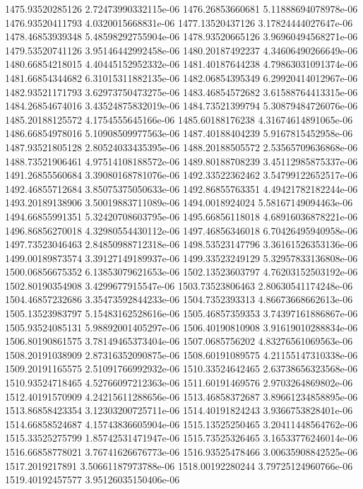 {1475.93520285126 2.72473990332115e-06
1476.26853660681 5.11888694078978e-06
1476.93520411793 4.0320015668831e-06
1477.13520437126 3.17824444027647e-06
1478.46853939348 5.48598292755904e-06
1478.93520665126 3.96960494568271e-06
1479.53520741126 3.95146442992458e-06
1480.20187492237 4.34606490266649e-06
1480.66854218015 4.40445152952332e-06
1481.40187644238 4.79863031091374e-06
1481.66854344682 6.31015311882135e-06
1482.06854395349 6.29920414012967e-06
1482.93521171793 3.62973750473275e-06
1483.46854572682 3.61588764413315e-06
1484.26854674016 3.43524875832019e-06
1484.73521399794 5.30879484726076e-06
1485.20188125572 4.1754555645166e-06
1485.60188176238 4.31674614891065e-06
1486.66854978016 5.10908509977563e-06
1487.40188404239 5.9167815452958e-06
1487.93521805128 2.80524033435395e-06
1488.20188505572 2.53565709636868e-06
1488.73521906461 4.97514108188572e-06
1489.80188708239 3.45112985875337e-06
1491.26855560684 3.39080168781076e-06
1492.33522362462 3.54799122652517e-06
1492.46855712684 3.85075375050633e-06
1492.86855763351 4.49421782182244e-06
1493.20189138906 3.50019883711089e-06
1494.0018924024 5.58167149094463e-06
1494.66855991351 5.32420708603795e-06
1495.66856118018 4.68916036878221e-06
1496.86856270018 4.32980554430112e-06
1497.46856346018 6.70426495940958e-06
1497.73523046463 2.84850988712318e-06
1498.53523147796 3.36161526353136e-06
1499.00189873574 3.39127149189937e-06
1499.33523249129 5.32957833136808e-06
1500.06856675352 6.13853079621653e-06
1502.13523603797 4.76203152503192e-06
1502.80190354908 3.4299677915547e-06
1503.73523806463 2.80630541174248e-06
1504.46857232686 3.35473592844233e-06
1504.7352393313 4.86673668662613e-06
1505.13523983797 5.15483162528616e-06
1505.46857359353 3.74397161886867e-06
1505.93524085131 5.98892001405297e-06
1506.40190810908 3.91619010288834e-06
1506.80190861575 3.78149465373404e-06
1507.0685756202 4.83276561069563e-06
1508.20191038909 2.87316352090875e-06
1508.60191089575 4.21155147310338e-06
1509.20191165575 2.51091766992932e-06
1510.33524642465 2.63738656323568e-06
1510.93524718465 4.52766097212363e-06
1511.60191469576 2.9703264869802e-06
1512.40191570909 4.24215611288656e-06
1513.46858372687 3.89661234858895e-06
1513.86858423354 3.12303200725711e-06
1514.40191824243 3.9366753828401e-06
1514.66858524687 4.15743836605904e-06
1515.13525250465 3.20411448564762e-06
1515.33525275799 1.85742531471947e-06
1515.73525326465 3.16533776246014e-06
1516.66858778021 3.76741626676773e-06
1516.93525478466 3.00635908842525e-06
1517.2019217891 3.50661187973788e-06
1518.00192280244 3.79725124960766e-06
1519.40192457577 3.95126035150406e-06
}
